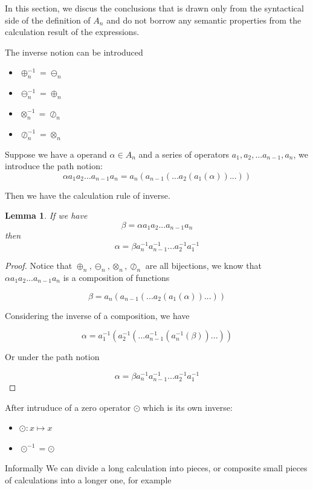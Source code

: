 \documentclass{article}
\newtheorem{lemma}{Lemma}
\begin{document}
In this section, we discus the conclusions that is drawn only from the syntactical side of the definition of $A_n$ and
do not borrow any semantic properties from the calculation result of the expressions.

The inverse notion can be introduced
\begin{itemize}
    \item $\oplus_n^{-1} = \ominus_n$
    \item $\ominus_n^{-1} = \oplus_n$
    \item $\otimes_n^{-1} = \oslash_n$
    \item $\oslash_n^{-1} = \otimes_n$
\end{itemize}

Suppose we have a operand $\alpha \in A_n $ and a series of operators $a_1, a_2, ... a_{n-1}, a_n$,
we introduce the path notion:
$$\alpha a_1 a_2 ... a_{n-1} a_n = a_n( a_{n-1}( ... a_2( a_1(\alpha) ) ... ) )$$

Then we have the calculation rule of inverse.

\begin{lemma}
\label{lemma:inverserule}
If we have
$$\beta = \alpha a_1 a_2 ... a_{n-1} a_n$$
then
$$\alpha = \beta a_n^{-1} a_{n-1}^{-1} ... a_2^{-1} a_1^{-1}$$
\end{lemma}

\begin{proof}
Notice that $\oplus_n, \ominus_n, \otimes_n, \oslash_n$ are all bijections, we know that $\alpha a_1 a_2 ... a_{n-1} a_n$ is a composition of functions

$$\beta = a_n( a_{n-1}( ... a_2( a_1(\alpha) ) ... ) )$$

Considering the inverse of a composition, we have

$$\alpha = a_1^{-1}( a_2^{-1}( ... a_{n-1}^{-1}( a_n^{-1}(\beta) ) ... ) )$$

Or under the path notion

$$\alpha = \beta a_n^{-1} a_{n-1}^{-1} ... a_2^{-1} a_1^{-1}$$

\qedhere
\end{proof}

After intruduce of a zero operator $\odot$ which is its own inverse:
\begin{itemize}
    \item $\odot: x \mapsto x$
    \item $\odot^{-1} = \odot$
\end{itemize}

Informally We can divide a long calculation into pieces, or composite small pieces of calculations into a longer one,
for example
\end{document}

